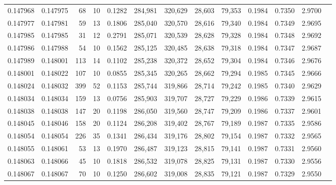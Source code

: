 \begin{tabular}{rrrrrrrrrrrrr}
0.147968 & 0.147975 &    68 &  10 &                                     0.1282 & 284,981 & 320,629 &  28,603 &  79,353 & 0.1984 & 0.7350 & 2.9700 \\
0.147977 & 0.147981 &    59 &  13 &                                     0.1806 & 285,040 & 320,570 &  28,616 &  79,340 & 0.1984 & 0.7349 & 2.9695 \\
0.147985 & 0.147985 &    31 &  12 &                                     0.2791 & 285,071 & 320,539 &  28,628 &  79,328 & 0.1984 & 0.7348 & 2.9692 \\
0.147986 & 0.147988 &    54 &  10 &                                     0.1562 & 285,125 & 320,485 &  28,638 &  79,318 & 0.1984 & 0.7347 & 2.9687 \\
0.147989 & 0.148001 &   113 &  14 &                                     0.1102 & 285,238 & 320,372 &  28,652 &  79,304 & 0.1984 & 0.7346 & 2.9676 \\
0.148001 & 0.148022 &   107 &  10 &                                     0.0855 & 285,345 & 320,265 &  28,662 &  79,294 & 0.1985 & 0.7345 & 2.9666 \\
0.148024 & 0.148032 &   399 &  52 &                                     0.1153 & 285,744 & 319,866 &  28,714 &  79,242 & 0.1985 & 0.7340 & 2.9629 \\
0.148034 & 0.148034 &   159 &  13 &                                     0.0756 & 285,903 & 319,707 &  28,727 &  79,229 & 0.1986 & 0.7339 & 2.9615 \\
0.148038 & 0.148038 &   147 &  20 &                                     0.1198 & 286,050 & 319,560 &  28,747 &  79,209 & 0.1986 & 0.7337 & 2.9601 \\
0.148045 & 0.148046 &   158 &  20 &                                     0.1124 & 286,208 & 319,402 &  28,767 &  79,189 & 0.1987 & 0.7335 & 2.9586 \\
0.148054 & 0.148054 &   226 &  35 &                                     0.1341 & 286,434 & 319,176 &  28,802 &  79,154 & 0.1987 & 0.7332 & 2.9565 \\
0.148055 & 0.148061 &    53 &  13 &                                     0.1970 & 286,487 & 319,123 &  28,815 &  79,141 & 0.1987 & 0.7331 & 2.9560 \\
0.148063 & 0.148066 &    45 &  10 &                                     0.1818 & 286,532 & 319,078 &  28,825 &  79,131 & 0.1987 & 0.7330 & 2.9556 \\
0.148067 & 0.148067 &    70 &  10 &                                     0.1250 & 286,602 & 319,008 &  28,835 &  79,121 & 0.1987 & 0.7329 & 2.9550 \\

\end{tabular}
